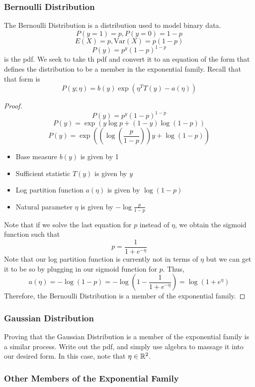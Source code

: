 \documentclass[12pt]{scrartcl}
\begin{document}
\subsubsection{Bernoulli Distribution}

The Bernoulli Distribution is a distribution used to model binary data.
\[P(y = 1) = p, P(y = 0) = 1 - p\]
\[E(X) = p, \text{Var}(X) = p(1-p)\]
\[P(y) = p^y(1-p)^{1-p}\]
is the pdf. We seek to take th pdf and convert it to an equation of the form
that defines the distribution to be a member in the exponential family. Recall
that that form is
\[P(y; \eta) = b(y)\exp(\eta^TT(y) - a(\eta))\]
\begin{proof}
    \[P(y) = p^y(1-p)^{1-p}\]
    \[P(y) = \exp(y\log p + (1-y)\log(1-p))\]
    \[P(y) = \exp((\log(\frac{p}{1-p}))y + \log(1-p))\]
    \begin{itemize}
        \item Base measure $b(y)$ is given by 1
        \item Sufficient statistic $T(y)$ is given by $y$
        \item Log partition function $a(\eta)$ is given by $\log (1-p)$
        \item Natural parameter $\eta$ is given by $-\log \frac{p}{1-p}$
    \end{itemize}
    Note that if we solve the last equation for $p$ instead of $\eta$, we obtain the sigmoid function such that
    \[p = \frac{1}{1 + e^{-\eta}}\]
    Note that our log partition function is currently not in terms of $\eta$ but we
    can get it to be so by plugging in our sigmoid function for $p$. Thus,
    \[a(\eta) = -\log(1-p) = -\log(1-\frac{1}{1 + e^{-\eta}}) = \log(1+ e^\eta)\]
    Therefore, the Bernoulli Distribution is a member of the exponential family.
\end{proof}

\subsubsection{Gaussian Distribution}

Proving that the Gaussian Distribution is a member of the exponential family is
a similar process. Write out the pdf, and simply use algebra to massage it into
our desired form. In this case, note that $\eta \in \mathbb R^2$.

\subsubsection{Other Members of the Exponential Family}
\end{document}
